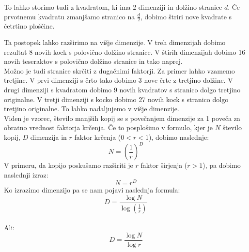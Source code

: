 \documentclass[a4paper, 12px]{article}
\begin{document}
        \addvspace{0.5cm}

        \addvspace{0.3cm}
        To lahko storimo tudi z kvadratom, ki ima 2 dimenziji in dolžino stranice $d$.
        Če prvotnemu kvadratu zmanjšamo stranico na $\frac{d}{2}$, dobimo štriri nove kvadrate s četrtino ploščine.

        \addvspace{0.5cm}

        \addvspace{0.3cm}
        Ta postopek lahko razširimo na višje dimenzije.
        V treh dimenzijah dobimo rezultat 8 novih kock s polovično dolžino stranice.
        V štirih dimenzijah dobimo 16 novih teseraktov s polovično dolžino stranice in tako naprej.\\
        
        Možno je tudi stranice skrčiti z dugačnimi faktorji.
        Za primer lahko vzamemo tretjine.
        V prvi dimenziji s črto tako dobimo 3 nove črte z tretjino dolžine.
        V drugi dimenziji s kvadratom dobimo 9 novih kvadratov s stranico dolgo tretjino originalne.
        V tretji dimenziji s kocko dobimo 27 novih kock s stranico dolgo tretjino originalne.
        To lahko nadaljujemo v višje dimenzije.\\
        
        Viden je vzorec, število manjših kopij se s povečanjem dimenzije za 1 poveča za obratno vrednost faktorja krčenja.
        Če to posplošimo v formulo, kjer je $N$ število kopij, $D$ dimenzija in $r$ faktor krčenja ($0<r<1$), dobimo naslednje:
        \[N=\left(\frac{1}{r}\right)^D\]
        V primeru, da kopijo poskušamo razširiti je $r$ faktor širjenja ($r>1$), pa dobimo naslednji izraz:
        \[N=r^D\]
        Ko izrazimo dimenzijo pa se nam pojavi naslednja formula:
        \[D=\frac{\log{N}}{\log{\left(\frac{1}{r}\right)}}\]\\
        Ali:
        \[D=\frac{\log{N}}{\log{r}}\]
\end{document}
